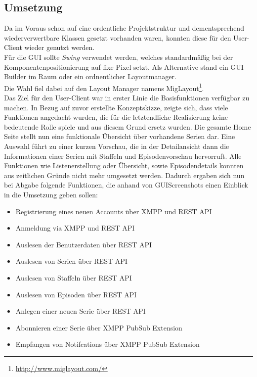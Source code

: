 \newpage
\subsection{Umsetzung}

Da im Voraus schon auf eine ordentliche Projektstruktur und dementsprechend wiederverwertbare Klassen gesetzt vorhanden waren, konnten diese für den User-Client wieder genutzt werden.\\

Für die GUI sollte \textit{Swing} verwendet werden, welches standardmäßig bei der Komponentenpositionierung auf fixe Pixel setzt. Als Alternative stand ein GUI Builder im Raum oder ein ordnentlicher Layoutmanager.\\
Die Wahl fiel dabei auf den Layout Manager namens MigLayout\footnote{\url{http://www.miglayout.com/}}.\\

Das Ziel für den User-Client war in erster Linie die Basisfunktionen verfügbar zu machen. In Bezug auf zuvor erstellte Konzeptskizze, zeigte sich, dass viele Funktionen angedacht wurden, die für die letztendliche Realisierung keine bedeutende Rolle spiele und aus diesem Grund ersetz wurden. Die gesamte Home Seite stellt nun eine funktionale Übersicht über vorhandene Serien dar. Eine Auswahl führt zu einer kurzen Vorschau, die in der Detailansicht dann die Informationen einer Serien mit Staffeln und Episodenvorschau hervorruft. Alle Funktionen wie Listenerstellung oder Übersicht, sowie Episodendetails konnten aus zeitlichen Gründe nicht mehr umgesetzt werden. Dadurch ergaben sich nun bei Abgabe folgende Funktionen, die anhand von GUIScreenshots einen Einblick in die Umsetzung geben sollen:

\begin{itemize}
  \item Registrierung eines neuen Accounts über XMPP und REST API
  \item Anmeldung via XMPP und REST API
  \item Auslesen der Benutzerdaten über REST API
  \item Auslesen von Serien über REST API
  \item Auslesen von Staffeln über REST API
  \item Auslesen von Episoden über REST API
  \item Anlegen einer neuen Serie über REST API
  \item Abonnieren einer Serie über XMPP PubSub Extension
  \item Empfangen von Notifcations über XMPP PubSub Extension
\end{itemize}



